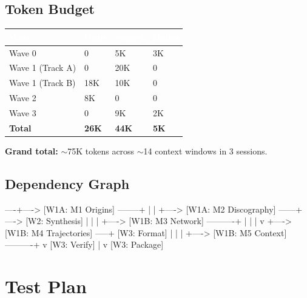 \documentclass[11pt,letterpaper]{article}
\newcommand{\tableheader}[1]{\textbf{\sffamily\textcolor{white}{#1}}}
\begin{document}
\subsection{Token Budget}

\begin{center}
\begin{tabularx}{\textwidth}{L{4cm}C{2cm}C{2cm}C{2cm}}
\toprule
{}
\tableheader{Wave} & \tableheader{Opus} & \tableheader{Sonnet} & \tableheader{Haiku} \\
\midrule
Wave 0 & 0 & 5K & 3K \\
Wave 1 (Track A) & 0 & 20K & 0 \\
Wave 1 (Track B) & 18K & 10K & 0 \\
Wave 2 & 8K & 0 & 0 \\
Wave 3 & 0 & 9K & 2K \\
\midrule
\textbf{Total} & \textbf{26K} & \textbf{44K} & \textbf{5K} \\
\bottomrule
\end{tabularx}
\end{center}

\textbf{Grand total:} $\sim$75K tokens across $\sim$14 context windows in 3 sessions.

\subsection{Dependency Graph}

\begin{asciibox}
  [W0: Schemas] ----+----> [W1A: M1 Origins] --------+
                    |                                  |
                    +----> [W1A: M2 Discography] ------+----> [W2: Synthesis]
                    |                                  |          |
                    +----> [W1B: M3 Network] ----------+          |
                    |                                  |          v
                    +----> [W1B: M4 Trajectories] -----+   [W3: Format]
                    |                                  |          |
                    +----> [W1B: M5 Context] ----------+          v
                                                           [W3: Verify]
                                                                  |
                                                                  v
                                                           [W3: Package]
\end{asciibox}

\section{Test Plan}
\end{document}
